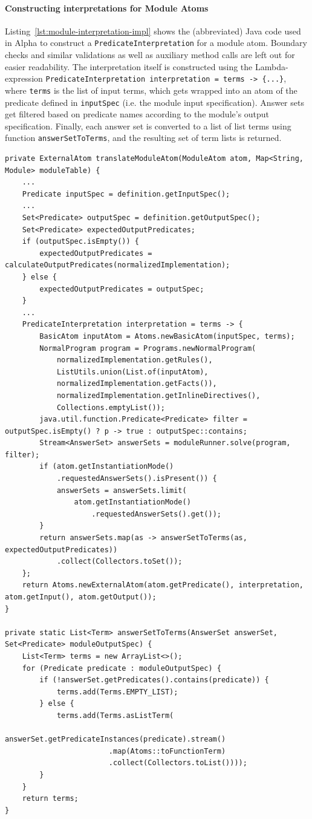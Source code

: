 \paragraph{Constructing interpretations for Module Atoms}
Listing~\ref{lst:module-interpretation-impl} shows the (abbreviated) Java code used in Alpha to construct a \texttt{PredicateInterpretation} for a module atom. Boundary checks and similar validations as well as auxiliary method calls are left out for easier readability. The interpretation itself is constructed using the Lambda-expression \texttt{PredicateInterpretation interpretation = terms -> \{...\}}, where \texttt{terms} is the list of input terms, which gets wrapped into an atom of the predicate defined in \texttt{inputSpec} (i.e. the module input specification). Answer sets get filtered based on predicate names according to the module's output specification. Finally, each answer set is converted to a list of list terms using function \texttt{answerSetToTerms}, and the resulting set of term lists is returned.
\begin{lstlisting}[style=java, label={lst:module-interpretation-impl}, caption={Constructing module interpretations}]
private ExternalAtom translateModuleAtom(ModuleAtom atom, Map<String, Module> moduleTable) {
    ...
    Predicate inputSpec = definition.getInputSpec();
    ...
    Set<Predicate> outputSpec = definition.getOutputSpec();
    Set<Predicate> expectedOutputPredicates;
    if (outputSpec.isEmpty()) {
    	expectedOutputPredicates = calculateOutputPredicates(normalizedImplementation);
    } else {
    	expectedOutputPredicates = outputSpec;
    }
    ...
    PredicateInterpretation interpretation = terms -> {
    	BasicAtom inputAtom = Atoms.newBasicAtom(inputSpec, terms);
    	NormalProgram program = Programs.newNormalProgram(
            normalizedImplementation.getRules(),
    		ListUtils.union(List.of(inputAtom), 
            normalizedImplementation.getFacts()), 
            normalizedImplementation.getInlineDirectives(), 
            Collections.emptyList());
    	java.util.function.Predicate<Predicate> filter = outputSpec.isEmpty() ? p -> true : outputSpec::contains;
    	Stream<AnswerSet> answerSets = moduleRunner.solve(program, filter);
    	if (atom.getInstantiationMode()
            .requestedAnswerSets().isPresent()) {
    		answerSets = answerSets.limit(
                atom.getInstantiationMode()
                    .requestedAnswerSets().get());
    	}
    	return answerSets.map(as -> answerSetToTerms(as, expectedOutputPredicates))
            .collect(Collectors.toSet());
    };
    return Atoms.newExternalAtom(atom.getPredicate(), interpretation, atom.getInput(), atom.getOutput());
}

private static List<Term> answerSetToTerms(AnswerSet answerSet, Set<Predicate> moduleOutputSpec) {
    List<Term> terms = new ArrayList<>();
    for (Predicate predicate : moduleOutputSpec) {
        if (!answerSet.getPredicates().contains(predicate)) {
            terms.add(Terms.EMPTY_LIST);
        } else {
            terms.add(Terms.asListTerm(
                    answerSet.getPredicateInstances(predicate).stream()
                        .map(Atoms::toFunctionTerm)
                        .collect(Collectors.toList())));
        }
    }
    return terms;
}
\end{lstlisting}    